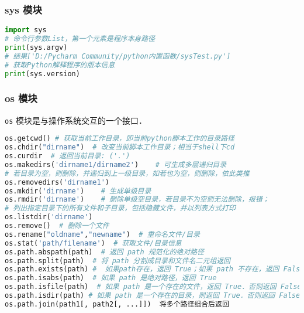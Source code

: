 \subsubsection{sys 模块}
\begin{lstlisting}[language=python]
import sys
# 命令行参数List，第一个元素是程序本身路径
print(sys.argv)
# 结果['D:/Pycharm Community/python内置函数/sysTest.py']
# 获取Python解释程序的版本信息
print(sys.version)
\end{lstlisting}

\subsubsection{os 模块}
\verb|os| 模块是与操作系统交互的一个接口．
\begin{lstlisting}[language=python]
os.getcwd() # 获取当前工作目录，即当前python脚本工作的目录路径
os.chdir("dirname")  # 改变当前脚本工作目录；相当于shell下cd
os.curdir  # 返回当前目录: ('.')
os.makedirs('dirname1/dirname2')    # 可生成多层递归目录
# 若目录为空，则删除，并递归到上一级目录，如若也为空，则删除，依此类推
os.removedirs('dirname1')
os.mkdir('dirname')    # 生成单级目录
os.rmdir('dirname')    # 删除单级空目录，若目录不为空则无法删除，报错；
# 列出指定目录下的所有文件和子目录，包括隐藏文件，并以列表方式打印
os.listdir('dirname')
os.remove()  # 删除一个文件
os.rename("oldname","newname")  # 重命名文件/目录
os.stat('path/filename')  # 获取文件/目录信息
os.path.abspath(path)  # 返回 path 规范化的绝对路径
os.path.split(path)  # 将 path 分割成目录和文件名二元组返回
os.path.exists(path) #  如果path存在，返回 True；如果 path 不存在，返回 False
os.path.isabs(path)  # 如果 path 是绝对路径，返回 True
os.path.isfile(path)  # 如果 path 是一个存在的文件，返回 True．否则返回 False
os.path.isdir(path) # 如果 path 是一个存在的目录，则返回 True．否则返回 False
os.path.join(path1[, path2[, ...]])  将多个路径组合后返回
\end{lstlisting}
